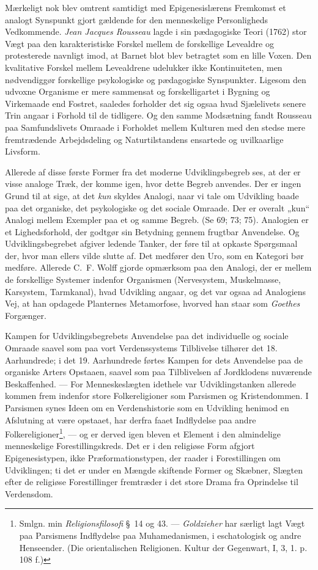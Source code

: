 \documentclass[12pt,a4paper]{book}
\newcommand{\apage}[1]{\marginnote{\footnotesize\textit{[#1]}}}
\begin{document}
Mærkeligt nok blev omtrent samtidigt med Epigenesislærens Fremkomst et analogt
Synspunkt gjort gældende for den menneskelige Personligheds Vedkommende. \emph{Jean
Jacques Rousseau} lagde i sin pædagogiske Teori (1762) stor Vægt paa den
karakteristiske Forskel mellem de forskellige Levealdre og protesterede navnligt
imod, at Barnet blot blev betragtet som en lille Voxen. Den kvalitative Forskel
mellem Levealdrene udelukker ikke Kontinuiteten, men nødvendiggør forskellige
psykologiske og pædagogiske Synspunkter. Ligesom den udvoxne Organisme er mere
sammensat og forskelligartet i Bygning og Virkemaade end Fostret, saaledes forholder
det sig ogsaa hvad Sjælelivets senere Trin angaar i Forhold til de tidligere. Og den
samme Modsætning fandt Rousseau paa Samfundslivets Omraade i Forholdet mellem \apage{231}
Kulturen med den stedse mere fremtrædende Arbejdsdeling og Naturtilstandens
ensartede og uvilkaarlige Livsform.

Allerede af disse første Former fra det moderne Udviklingsbegreb ses, at der er
visse analoge Træk, der komme igen, hvor dette Begreb anvendes. Der er ingen
Grund til at sige, at det \emph{kun} skyldes Analogi, naar vi tale om Udvikling
baade paa det organiske, det psykologiske og det sociale Omraade. Der er overalt
„kun“ Analogi mellem Exempler paa et og samme Begreb. (Se 69; 73; 75). Analogien
er et Lighedsforhold, der godtgør sin Betydning gennem frugtbar Anvendelse. Og
Udviklingsbegrebet afgiver ledende Tanker, der føre til at opkaste Spørgsmaal
der, hvor man ellers vilde slutte af. Det medfører den Uro, som en Kategori bør
medføre. Allerede C.\ F. Wolff gjorde opmærksom paa den Analogi, der er
mellem de forskellige Systemer indenfor Organismen (Nervesystem, Muskelmasse,
Karsystem, Tarmkanal), hvad Udvikling angaar, og det var ogsaa ad Analogiens Vej,
at han opdagede Planternes Metamorfose, hvorved han staar som \emph{Goethes}
Forgænger.

Kampen for Udviklingsbegrebets Anvendelse paa det individuelle og
sociale Omraade saavel som paa vort Verdenssystems Tilblivelse tilhører det 18.
Aarhundrede; i det 19. Aarhundrede førtes Kampen for dets Anvendelse paa de
organiske Arters Opstaaen, saavel som paa Tilblivelsen af Jordklodens nuværende
Beskaffenhed. --- For Menneskeslægten idethele var Udviklingstanken allerede
kommen frem indenfor store Folkereligioner som Parsismen og Kristendommen. I
Parsismen synes Ideen om en Verdenshistorie som en Udvikling henimod en
Afslutning at være opstaaet, har derfra faaet Indflydelse paa andre
Folkereligioner\footnote{Smlgn. min \emph{Religionsfilosofi} \S\ 14 og 43. ---
\emph{Goldzieher} har særligt lagt Vægt paa Parsismens Indflydelse paa
Muhamedanismen, i eschatologisk og andre Henseender. (Die orientalischen
Religionen. Kultur der Gegenwart, I, 3, 1. p. 108 f.)}, --- og er derved igen
bleven et Element i den almindelige menneskelige Forestillingskreds. Det er i den
religiøse Form afgjort Epigenesistypen, ikke Præformationstypen, der raader i
Forestillingen om Udviklingen; ti det er under en Mængde skiftende Former og
Skæbner, Slægten efter de \apage{232} religiøse Forestillinger fremtræder i det store Drama
fra Oprindelse til Verdensdom.
\end{document}
